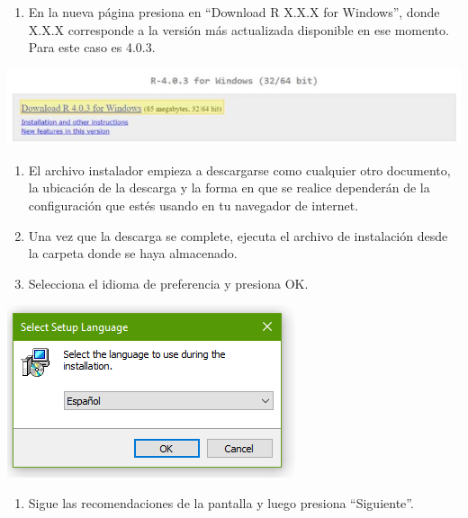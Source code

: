 \documentclass[
]{book}
\providecommand{\tightlist}{%
  \setlength{\itemsep}{0pt}\setlength{\parskip}{0pt}}
\begin{document}
\begin{enumerate}
\def\labelenumi{\arabic{enumi}.}
\setcounter{enumi}{3}
\tightlist
\item
  En la nueva página presiona en ``Download R X.X.X for Windows'', donde X.X.X corresponde a la versión más actualizada disponible en ese momento. Para este caso es 4.0.3.
\end{enumerate}

\includegraphics{data/03.png}

\begin{enumerate}
\def\labelenumi{\arabic{enumi}.}
\setcounter{enumi}{4}
\item
  El archivo instalador empieza a descargarse como cualquier otro documento, la ubicación de la descarga y la forma en que se realice dependerán de la configuración que estés usando en tu navegador de internet.
\item
  Una vez que la descarga se complete, ejecuta el archivo de instalación desde la carpeta donde se haya almacenado.
\item
  Selecciona el idioma de preferencia y presiona OK.
\end{enumerate}

\includegraphics{data/04.png}

\begin{enumerate}
\def\labelenumi{\arabic{enumi}.}
\setcounter{enumi}{7}
\tightlist
\item
  Sigue las recomendaciones de la pantalla y luego presiona ``Siguiente''.
\end{enumerate}
\end{document}
